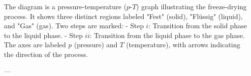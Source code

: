 The diagram is a pressure-temperature (\( p \)-\( T \)) graph illustrating the freeze-drying process. It shows three distinct regions labeled "Fest" (solid), "Flüssig" (liquid), and "Gas" (gas). Two steps are marked:  
- Step \( i \): Transition from the solid phase to the liquid phase.  
- Step \( ii \): Transition from the liquid phase to the gas phase.  
The axes are labeled \( p \) (pressure) and \( T \) (temperature), with arrows indicating the direction of the process.

---